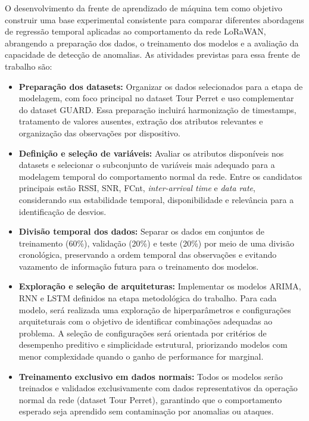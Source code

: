 O desenvolvimento da frente de aprendizado de máquina tem como objetivo
construir uma base experimental consistente para comparar diferentes abordagens
de regressão temporal aplicadas ao comportamento da rede LoRaWAN, abrangendo a
preparação dos dados, o treinamento dos modelos e a avaliação da capacidade de
detecção de anomalias. As atividades previstas para essa frente de trabalho são:
\begin{itemize}
    \item \textbf{Preparação dos datasets:} Organizar os dados selecionados para a etapa de modelagem, com foco principal no dataset Tour Perret e uso complementar do dataset GUARD. Essa preparação incluirá harmonização de timestamps, tratamento de valores ausentes, extração dos atributos relevantes e organização das observações por dispositivo.

    \item \textbf{Definição e seleção de variáveis:} Avaliar os atributos disponíveis nos datasets e selecionar o subconjunto de variáveis mais adequado para a modelagem temporal do comportamento normal da rede. Entre os candidatos principais estão RSSI, SNR, FCnt, \textit{inter-arrival time} e \textit{data rate}, considerando sua estabilidade temporal, disponibilidade e relevância para a identificação de desvios.

    \item \textbf{Divisão temporal dos dados:} Separar os dados em conjuntos de treinamento (60\%), validação (20\%) e teste (20\%) por meio de uma divisão cronológica, preservando a ordem temporal das observações e evitando vazamento de informação futura para o treinamento dos modelos.

    \item \textbf{Exploração e seleção de arquiteturas:} Implementar os modelos ARIMA, RNN e LSTM definidos na etapa metodológica do trabalho. Para cada modelo, será realizada uma exploração de hiperparâmetros e configurações arquiteturais com o objetivo de identificar combinações adequadas ao problema. A seleção de configurações será orientada por critérios de desempenho preditivo e simplicidade estrutural, priorizando modelos com menor complexidade quando o ganho de performance for marginal.

    \item \textbf{Treinamento exclusivo em dados normais:} Todos os modelos serão treinados e validados exclusivamente com dados representativos da operação normal da rede (dataset Tour Perret), garantindo que o comportamento esperado seja aprendido sem contaminação por anomalias ou ataques.


\end{itemize}
